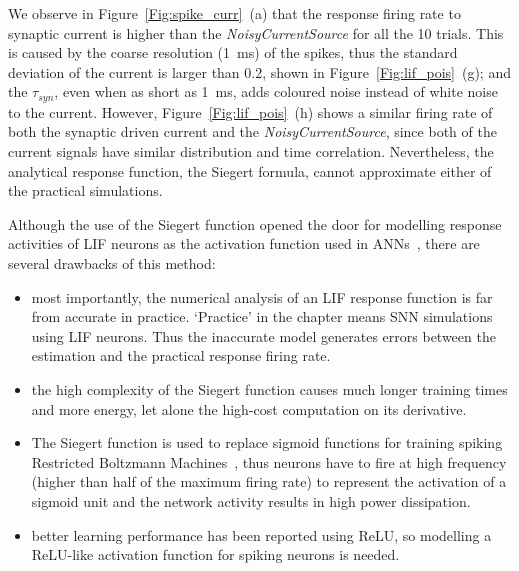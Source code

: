 	We observe in Figure~\ref{Fig:spike_curr}~(a) that the response firing rate to synaptic current is higher than the \textit{NoisyCurrentSource} for all the 10 trials.
	This is caused by the coarse resolution (1~ms) of the spikes, thus the standard deviation of the current is larger than 0.2, shown in Figure~\ref{Fig:lif_pois}~(g);
	and the $\tau_{syn}$, even when as short as 1~ms, adds coloured noise instead of white noise to the current.
	However, Figure~\ref{Fig:lif_pois}~(h) shows a similar firing rate of both the synaptic driven current and the \textit{NoisyCurrentSource}, since both of the current signals have similar distribution and time correlation.
	Nevertheless, the analytical response function, the Siegert formula, cannot approximate either of the practical simulations.
	
	Although the use of the Siegert function opened the door for modelling response activities of LIF neurons as the activation function used in ANNs~\cite{Jug_etal_2012}, there are several drawbacks of this method:
	\begin{itemize}
		\item most importantly, the numerical analysis of an LIF response function is far from accurate in practice. `Practice' in the chapter means SNN simulations using LIF neurons.
		Thus the inaccurate model generates errors between the estimation and the practical response firing rate.
		
		
		\item the high complexity of the Siegert function causes much longer training times and more energy, let alone the high-cost computation on its derivative.
		\item The Siegert function is used to replace sigmoid functions for training spiking Restricted Boltzmann Machines~\cite{Jug_etal_2012}, thus neurons have to fire at high frequency (higher than half of the maximum firing rate) to represent the activation of a sigmoid unit and the network activity results in high power dissipation.
		\item better learning performance has been reported using ReLU, so modelling a ReLU-like activation function for spiking neurons is needed.  
	\end{itemize}
	
